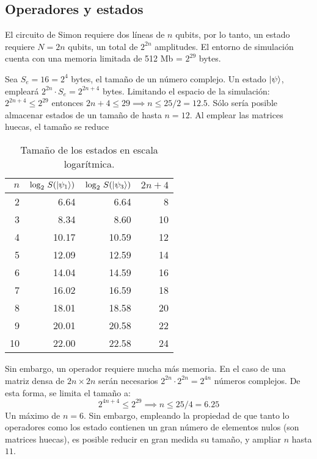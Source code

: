 \begin{ejemplo}
%


\subsection{Operadores y estados}

El circuito de Simon requiere dos líneas de $n$ qubits, por lo tanto, un estado 
requiere $N=2n$ qubits, un total de $2^{2n}$ amplitudes.
El entorno de simulación cuenta con una memoria limitada de 512 Mb = $2^{29}$ 
bytes.

Sea $S_e = 16 = 2^4$ bytes, el tamaño de un número complejo. Un estado 
$\ket{\psi}$, empleará $2^{2n}\cdot S_e = 2^{2n+4}$ bytes. Limitando el espacio 
de la simulación: $2^{2n+4} \leq 2^{29}$ entonces $2n+4 \leq 29 \implies n \leq 
25/2 = 12.5$. Sólo sería posible almacenar estados de un tamaño de hasta $n=12$.
Al emplear las matrices huecas, el tamaño se reduce

\begin{table}[h]
	\centering
	\begin{tabular}{*{4}{r}}
		\toprule
		$n$ & $\log_2 \, S(\ket{\psi_1})$ & $\log_2 \, S(\ket{\psi_3})$ & $2n+4$ \\
		\midrule
		2 	& 6.64	& 6.64	& 8\\
		3 	& 8.34	& 8.60	& 10\\
		4 	& 10.17	& 10.59	& 12\\
		5 	& 12.09	& 12.59	& 14\\
		6 	& 14.04	& 14.59	& 16\\
		7 	& 16.02	& 16.59	& 18\\
		8 	& 18.01	& 18.58	& 20\\
		9 	& 20.01	& 20.58	& 22\\
		10 	& 22.00	& 22.58	& 24\\
		\bottomrule
	\end{tabular}
	\caption{Tamaño de los estados en escala logarítmica.}
\end{table}

Sin embargo, un operador requiere mucha más memoria. En el caso de una matriz 
densa de $2n \times 2n$ serán necesarios $2^{2n} \cdot 2^{2n} = 2^{4n}$ números 
complejos. De esta forma, se limita el tamaño a:
$$2^{4n+4} \leq 2^{29} \implies n \leq 25/4 = 6.25 $$
Un máximo de $n = 6$. Sin embargo, empleando la propiedad de que tanto lo 
operadores como los estado contienen un gran número de elementos nulos (son 
matrices huecas), es posible reducir en gran medida su tamaño, y ampliar $n$ 
hasta $11$.


\end{ejemplo}
